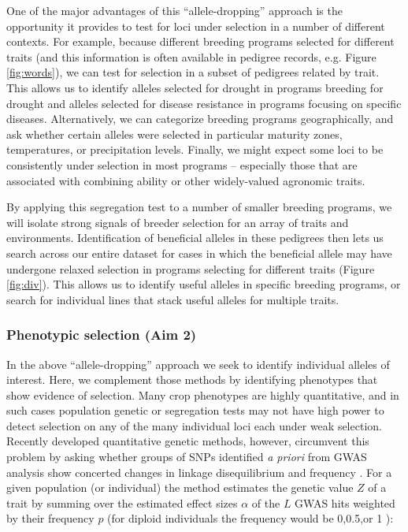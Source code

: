 \documentclass[12pt]{article}
\begin{document}
One of the major advantages of this 	``allele-dropping'' approach is the opportunity it provides to test for loci under selection in a number of different contexts.
For example, because  different breeding programs selected for different traits (and this information is often available in pedigree records, e.g. Figure \ref{fig:words}), we can test for selection in a subset of pedigrees related by trait.
This allows us to identify alleles selected for drought in programs breeding for drought and alleles selected for disease resistance in programs focusing on specific diseases.
Alternatively, we can categorize breeding programs geographically, and ask whether certain alleles were selected in particular maturity zones, temperatures, or precipitation levels.
Finally, we might expect some loci to be consistently under selection in most programs -- especially those that are associated with combining ability or other widely-valued agronomic traits. 

By applying this segregation test to a number of smaller breeding programs, we will  isolate strong signals of breeder selection for an array of traits and environments. 
Identification of beneficial alleles in these pedigrees then lets us search across our entire dataset for cases in which the beneficial allele may have undergone relaxed selection in programs selecting for different traits (Figure \ref{fig:div}).
This allows us to identify useful alleles in specific breeding programs, or search for individual lines that stack useful alleles for multiple traits. 


\subsubsection*{Phenotypic selection (Aim 2)}

In the above ``allele-dropping'' approach we seek to identify individual alleles of interest.
Here, we complement those methods by identifying phenotypes that show evidence of selection.
Many crop phenotypes are highly quantitative, and in such cases population genetic or segregation tests may not have high power to detect selection on any of the many individual loci each under weak selection.
Recently developed quantitative genetic methods, however, circumvent this problem by asking whether groups of SNPs identified \emph{a priori} from GWAS analysis show concerted changes in linkage disequilibrium and frequency \citep{Berg:2014bs}.
For a given population (or individual) the method estimates the genetic value $Z$ of a trait by summing over the estimated effect sizes $\alpha$ of the $L$ GWAS hits weighted by their frequency $p$ (for diploid individuals the frequency would be 0,0.5,or 1 ): 
\end{document}
